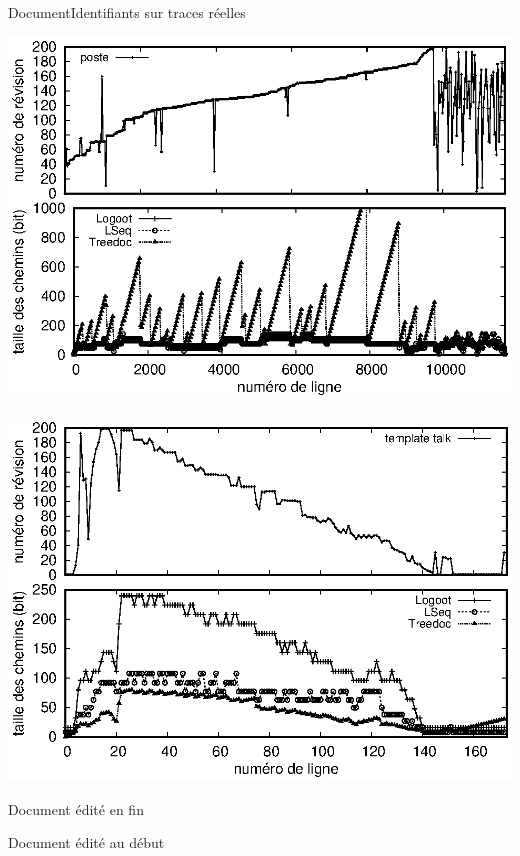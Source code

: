 \begin{frame}{Document}{Identifiants sur traces réelles}

  \hspace{-1cm}
  \begin{minipage}{0.45\textwidth}
    \includegraphics[width=1.29\textwidth]{img/replication/poste.eps}
  \end{minipage}
  \hspace{1.2cm}
  \begin{minipage}{0.45\textwidth}
      {\includegraphics[width=1.29\textwidth]{img/replication/templatetalk.eps}}%
  \end{minipage}

  \begin{minipage}{0.4\textwidth}
    Document édité en fin
  \end{minipage}
  \hspace{1.6cm}
  \begin{minipage}{0.4\textwidth}
      {Document édité au début}%
  \end{minipage}


\end{frame}


